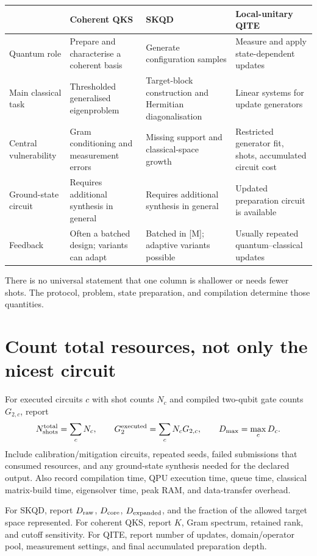 \documentclass[11pt,a4paper,oneside]{report}
\begin{document}
\begin{center}
\small
\begin{tabularx}{\linewidth}{@{}p{28mm}YYY@{}}
\toprule & Coherent QKS & SKQD & Local-unitary QITE\\\midrule
Quantum role & Prepare and characterise a coherent basis & Generate configuration samples & Measure and apply state-dependent updates\\
Main classical task & Thresholded generalised eigenproblem & Target-block construction and Hermitian diagonalisation & Linear systems for update generators\\
Central vulnerability & Gram conditioning and measurement errors & Missing support and classical-space growth & Restricted generator fit, shots, accumulated circuit cost\\
Ground-state circuit & Requires additional synthesis in general & Requires additional synthesis in general & Updated preparation circuit is available\\
Feedback & Often a batched design; variants can adapt & Batched in [M]; adaptive variants possible & Usually repeated quantum--classical updates\\\bottomrule
\end{tabularx}
\end{center}
There is no universal statement that one column is shallower or needs fewer shots. The protocol, problem, state preparation, and compilation determine those quantities.

\section{Count total resources, not only the nicest circuit}
For executed circuits $c$ with shot counts $N_c$ and compiled two-qubit gate counts $G_{2,c}$, report
\begin{equation}
N_{\rm shots}^{\rm total}=\sum_cN_c,\qquad
G_2^{\rm executed}=\sum_cN_cG_{2,c},\qquad
D_{\max}=\max_c D_c.
\end{equation}
Include calibration/mitigation circuits, repeated seeds, failed submissions that consumed resources, and any ground-state synthesis needed for the declared output. Also record compilation time, QPU execution time, queue time, classical matrix-build time, eigensolver time, peak RAM, and data-transfer overhead.

For SKQD, report $D_{\rm raw}$, $D_{\rm core}$, $D_{\rm expanded}$, and the fraction of the allowed target space represented. For coherent QKS, report $K$, Gram spectrum, retained rank, and cutoff sensitivity. For QITE, report number of updates, domain/operator pool, measurement settings, and final accumulated preparation depth.
\end{document}
